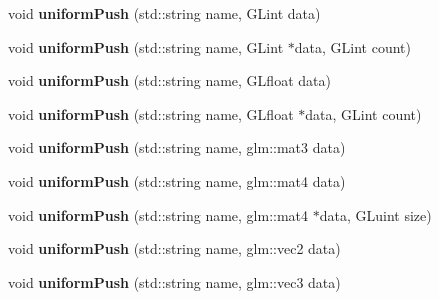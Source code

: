 \begin{DoxyCompactItemize}
\item 
\hypertarget{classfillwave_1_1core_1_1Program_a9a1e6a4fa2f03b340c2b77673e80156d}{}void {\bfseries uniform\+Push} (std\+::string name, G\+Lint data)\label{classfillwave_1_1core_1_1Program_a9a1e6a4fa2f03b340c2b77673e80156d}

\item 
\hypertarget{classfillwave_1_1core_1_1Program_aa0e4ea596bb9cabac24e49ab48959e78}{}void {\bfseries uniform\+Push} (std\+::string name, G\+Lint $\ast$data, G\+Lint count)\label{classfillwave_1_1core_1_1Program_aa0e4ea596bb9cabac24e49ab48959e78}

\item 
\hypertarget{classfillwave_1_1core_1_1Program_acd6fdaf37f627d747b01e89343068dd9}{}void {\bfseries uniform\+Push} (std\+::string name, G\+Lfloat data)\label{classfillwave_1_1core_1_1Program_acd6fdaf37f627d747b01e89343068dd9}

\item 
\hypertarget{classfillwave_1_1core_1_1Program_ab9c7c27d4b38755e736afa7bafc3d561}{}void {\bfseries uniform\+Push} (std\+::string name, G\+Lfloat $\ast$data, G\+Lint count)\label{classfillwave_1_1core_1_1Program_ab9c7c27d4b38755e736afa7bafc3d561}

\item 
\hypertarget{classfillwave_1_1core_1_1Program_a7fc3be486eb7712a97f382493b549f73}{}void {\bfseries uniform\+Push} (std\+::string name, glm\+::mat3 data)\label{classfillwave_1_1core_1_1Program_a7fc3be486eb7712a97f382493b549f73}

\item 
\hypertarget{classfillwave_1_1core_1_1Program_a247e4677a6c92fee5f974c30ffcc333e}{}void {\bfseries uniform\+Push} (std\+::string name, glm\+::mat4 data)\label{classfillwave_1_1core_1_1Program_a247e4677a6c92fee5f974c30ffcc333e}

\item 
\hypertarget{classfillwave_1_1core_1_1Program_a8efb51632777440df79b5a6539006e4c}{}void {\bfseries uniform\+Push} (std\+::string name, glm\+::mat4 $\ast$data, G\+Luint size)\label{classfillwave_1_1core_1_1Program_a8efb51632777440df79b5a6539006e4c}

\item 
\hypertarget{classfillwave_1_1core_1_1Program_a47f5a10984a7330cbed076a8d0b40f61}{}void {\bfseries uniform\+Push} (std\+::string name, glm\+::vec2 data)\label{classfillwave_1_1core_1_1Program_a47f5a10984a7330cbed076a8d0b40f61}

\item 
\hypertarget{classfillwave_1_1core_1_1Program_a465a311b58225654c5e0897d796f366a}{}void {\bfseries uniform\+Push} (std\+::string name, glm\+::vec3 data)\label{classfillwave_1_1core_1_1Program_a465a311b58225654c5e0897d796f366a}


\end{DoxyCompactItemize}
